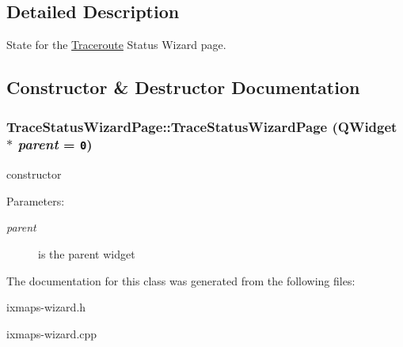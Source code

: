 \subsection{Detailed Description}
State for the \hyperlink{classTraceroute}{Traceroute} Status Wizard page. 

\subsection{Constructor \& Destructor Documentation}
\hypertarget{classTraceStatusWizardPage_5910e8f90a653ebf176478d196f4d0a5}{
\subsubsection[TraceStatusWizardPage]{\setlength{\rightskip}{0pt plus 5cm}TraceStatusWizardPage::TraceStatusWizardPage (QWidget $\ast$ {\em parent} = {\tt 0})}}
\label{classTraceStatusWizardPage_5910e8f90a653ebf176478d196f4d0a5}


constructor \begin{Desc}
\item[Parameters:]
\begin{description}
\item[{\em parent}]is the parent widget \end{description}
\end{Desc}


The documentation for this class was generated from the following files:\begin{CompactItemize}
\item 
ixmaps-wizard.h\item 
ixmaps-wizard.cpp\end{CompactItemize}
